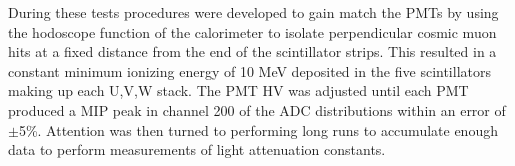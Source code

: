 During these tests procedures were developed to gain match the PMTs by using the hodoscope function of the calorimeter to isolate perpendicular cosmic muon hits at a fixed distance from the end of the scintillator strips. This resulted in a constant minimum ionizing energy of 10 MeV deposited in the five scintillators making up each U,V,W stack.  The PMT HV was adjusted until each PMT produced a MIP peak in channel 200 of the ADC distributions within an error of $\pm$5\%.  Attention was then turned to performing long runs to accumulate enough data to perform measurements of light attenuation constants.  

\clearpage
